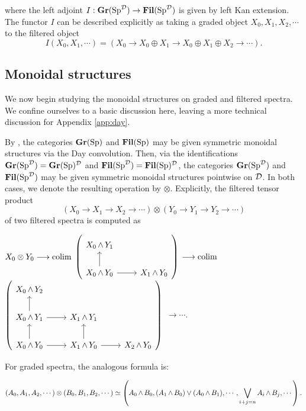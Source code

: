 where the left adjoint $I: \operatorname{\textbf{Gr}}(\operatorname{\text{Sp}}^{\operatorname{\mathcal{D}}}) \to \operatorname{\textbf{Fil}}(\operatorname{\text{Sp}}^{\operatorname{\mathcal{D}}})$ is given by left Kan extension.  The functor $I$ can be described explicitly as taking a graded object $X_0,X_1,X_2,\cdots$ to the filtered object $$I(X_0, X_1, \cdots) = (X_0\to X_0\oplus X_1\to X_0 \oplus X_1\oplus X_2\to \cdots).$$   


\subsection{Monoidal structures}\label{sect:monoidal}
We now begin studying the monoidal structures on graded and filtered spectra.  We confine ourselves to a basic discussion here, leaving a more technical discussion for Appendix \ref{app:day}.

By \cite[Example 2.2.6.17]{HA}, the categories $\operatorname{\textbf{Gr}}(\operatorname{\text{Sp}})$ and $\operatorname{\textbf{Fil}}(\operatorname{\text{Sp}})$ may be given symmetric monoidal structures via the Day convolution.  Then, via the identifications $\operatorname{\textbf{Gr}}(\operatorname{\text{Sp}}^{\operatorname{\mathcal{D}}}) = \operatorname{\textbf{Gr}}(\operatorname{\text{Sp}})^{\operatorname{\mathcal{D}}}$ and $\operatorname{\textbf{Fil}}(\operatorname{\text{Sp}}^{\operatorname{\mathcal{D}}}) = \operatorname{\textbf{Fil}}(\operatorname{\text{Sp}})^{\operatorname{\mathcal{D}}}$, the categories $\operatorname{\textbf{Gr}}(\operatorname{\text{Sp}}^{\operatorname{\mathcal{D}}})$ and $\operatorname{\textbf{Fil}}(\operatorname{\text{Sp}}^{\operatorname{\mathcal{D}}})$ may be given symmetric monoidal structures pointwise on $\operatorname{\mathcal{D}}$.  In both cases, we denote the resulting operation by $\otimes$.  Explicitly, the filtered tensor product $$\left(X_0 \longrightarrow X_1 \longrightarrow X_2 \longrightarrow \cdots \right) \otimes \left(Y_0 \longrightarrow Y_1 \longrightarrow Y_2 \longrightarrow \cdots \right)$$
of two filtered spectra is computed as

\begin{center}
$X_0 \otimes Y_0 \longrightarrow \operatorname*{\text{colim}} $
{$ \left(\begin{tikzcd} X_0 \smsh Y_1 \\  X_0 \smsh Y_0 \arrow{u} \arrow{r} & X_1 \smsh Y_0 \end{tikzcd} \right) $} 
$\longrightarrow \operatorname*{\text{colim}}$
 {$ \left( \begin{tikzcd} X_0 \smsh Y_2 \\ X_0 \smsh Y_1 \arrow{r} \arrow{u} & X_1 \smsh Y_1  \\ X_0 \smsh Y_0 \arrow{r} \arrow{u} & X_1 \smsh Y_0 \arrow{u} \arrow{r} & X_2 \smsh Y_0 \end{tikzcd} \right) $}
$\longrightarrow \cdots.$
\end{center}

For graded spectra, the analogous formula is:

$$(A_0,A_1,A_2,\cdots) \otimes (B_0,B_1,B_2,\cdots) \simeq \left( A_0 \operatorname{\wedge} B_0, (A_1 \operatorname{\wedge} B_0) \vee (A_0 \operatorname{\wedge} B_1), \cdots, \bigvee_{i+j=n} A_i \operatorname{\wedge} B_j, \cdots \right).$$





